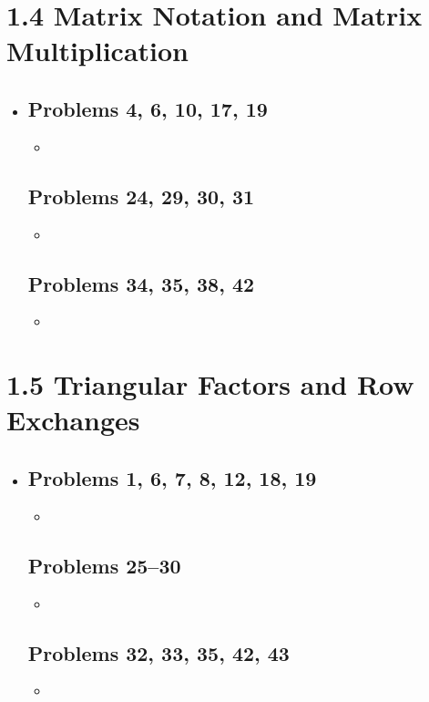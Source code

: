 \section{1.4 Matrix Notation and Matrix Multiplication}
\begin{itemize}
  \item []

    \subsection{Problems 4, 6, 10, 17, 19}
    \begin{itemize}
      \item
    \end{itemize}

    \subsection{Problems 24, 29, 30, 31}
    \begin{itemize}
      \item
    \end{itemize}

    \subsection{Problems 34, 35, 38, 42}
    \begin{itemize}
      \item
    \end{itemize}

\end{itemize}

\section{1.5 Triangular Factors and Row Exchanges}
\begin{itemize}
  \item []

    \subsection{Problems 1, 6, 7, 8, 12, 18, 19}
    \begin{itemize}
      \item
    \end{itemize}

    \subsection{Problems 25--30}
    \begin{itemize}
      \item
    \end{itemize}

    \subsection{Problems 32, 33, 35, 42, 43}
    \begin{itemize}
      \item
    \end{itemize}

\end{itemize}

